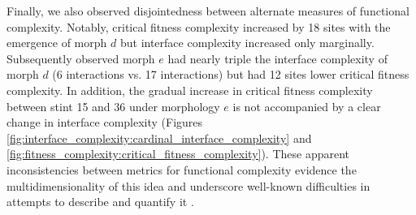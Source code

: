 Finally, we also observed disjointedness between alternate measures of functional complexity.
Notably, critical fitness complexity increased by 18 sites with the emergence of morph $d$ but interface complexity increased only marginally.
Subsequently observed morph $e$ had nearly triple the interface complexity of morph $d$ (6 interactions vs. 17 interactions) but had 12 sites lower critical fitness complexity.
In addition, the gradual increase in critical fitness complexity between stint 15 and 36 under morphology $e$ is not accompanied by a clear change in interface complexity (Figures \ref{fig:interface_complexity:cardinal_interface_complexity} and \ref{fig:fitness_complexity:critical_fitness_complexity}).
These apparent inconsistencies between metrics for functional complexity evidence the multidimensionality of this idea and underscore well-known difficulties in attempts to describe and quantify it \citep{bottcher2018molecules}.
